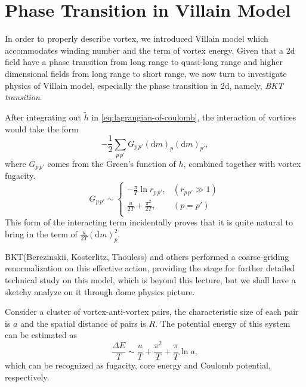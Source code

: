 
\section{Phase Transition in Villain Model}
In order to properly describe vortex, we introduced Villain model which accommodates winding number and the term of vortex energy. Given that a 2d field have a phase transition from long range to quasi-long range and higher dimensional fields from long range to short range, we now turn to investigate physics of Villain model, especially the phase transition in 2d, namely, \emph{BKT transition}.

After integrating out $\tilde{h}$ in \eqref{eq:lagrangian-of-coulomb}, the interaction of vortices would take the form
\begin{equation}
  - \frac{1}{2} \sum_{p \, p'} G_{p\, p'} \left( \mathrm{d} m \right)_{p} \left( \mathrm{d} m \right)_{p'},
\end{equation}
where $G_{p\, p'}$ comes from the Green's function of $h$, combined together with vortex fugacity.
\begin{equation}
  G_{p\, p'} \sim 
  \begin{cases}
    - \frac{\pi}{T} \ln r_{p\, p'} , & \left( r_{p\, p'} \gg 1 \right)\\
    \frac{u}{2T} + \frac{\pi ^{2}}{2T} , & \left( p=p' \right) \\
  \end{cases}
\end{equation}
This form of the interacting term incidentally proves that it is quite natural to bring in the term of $\frac{u}{2T} \left( \mathrm{d} m \right)_{p}^{2}$.

BKT(Berezinskii, Kosterlitz, Thouless) and others performed a coarse-griding renormalization on this effective action, providing the stage for further detailed technical study on this model, which is beyond this lecture, but we shall have a sketchy analyze on it through dome physics picture.

Consider a cluster of vortex-anti-vortex pairs, the characteristic size of each pair is $a$ and the spatial distance of pairs is $R$. The potential energy of this system can be estimated as
\begin{equation}
  \frac{\Delta E}{T} \sim \frac{u}{T} + \frac{\pi ^{2}}{T} + \frac{\pi}{T} \ln a,
\end{equation}
which can be recognized as fugacity, core energy and Coulomb potential, respectively.

